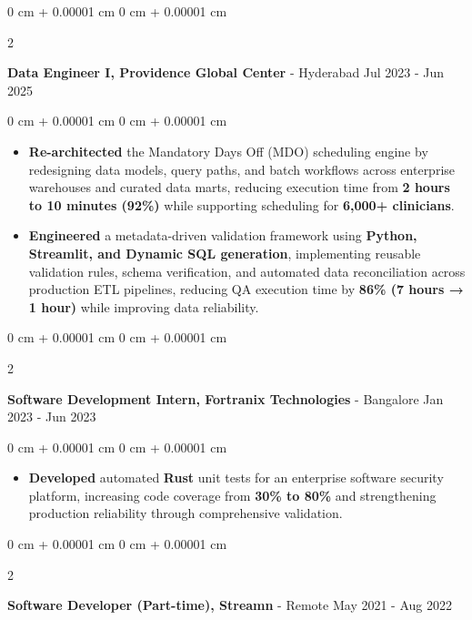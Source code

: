 \documentclass[10pt, letterpaper]{article}
\newenvironment{highlights}{
    \begin{itemize}[
        topsep=0.10 cm,
        parsep=0.10 cm,
        partopsep=0pt,
        itemsep=0pt,
        leftmargin=0 cm + 10pt
    ]
}{
    \end{itemize}
}
\newenvironment{onecolentry}{
    \begin{adjustwidth}{
        0 cm + 0.00001 cm
    }{
        0 cm + 0.00001 cm
    }
}{
    \end{adjustwidth}
}
\newenvironment{twocolentry}[2][]{
    \onecolentry
    \def\secondColumn{#2}
    \setcolumnwidth{\fill, 4.5 cm}
    \begin{paracol}{2}
}{
    \switchcolumn \raggedleft \secondColumn
    \end{paracol}
    \endonecolentry
}
\begin{document}
\vspace{0.2 cm}

\begin{twocolentry}{
Jul 2023 - Jun 2025
}
\textbf{Data Engineer I, Providence Global Center} - Hyderabad\end{twocolentry}

\vspace{0.10 cm}
\begin{onecolentry}
\begin{highlights}
\item \textbf{Re-architected} the Mandatory Days Off (MDO) scheduling engine by redesigning data models, query paths, and batch workflows across enterprise warehouses and curated data marts, reducing execution time from \textbf{2 hours to 10 minutes (92\%)} while supporting scheduling for \textbf{6,000+ clinicians}.

\item \textbf{Engineered} a metadata-driven validation framework using \textbf{Python, Streamlit, and Dynamic SQL generation}, implementing reusable validation rules, schema verification, and automated data reconciliation across production ETL pipelines, reducing QA execution time by \textbf{86\% (7 hours → 1 hour)} while improving data reliability.
\end{highlights}
\end{onecolentry}

\vspace{0.2 cm}

\begin{twocolentry}{
Jan 2023 - Jun 2023
}
\textbf{Software Development Intern, Fortranix Technologies} - Bangalore\end{twocolentry}

\vspace{0.10 cm}
\begin{onecolentry}
\begin{highlights}
\item \textbf{Developed} automated \textbf{Rust} unit tests for an enterprise software security platform, increasing code coverage from \textbf{30\% to 80\%} and strengthening production reliability through comprehensive validation.
\end{highlights}
\end{onecolentry}

\vspace{0.2 cm}

\begin{twocolentry}{
May 2021 - Aug 2022
}
\textbf{Software Developer (Part-time), Streamn} - Remote\end{twocolentry}
\end{document}
